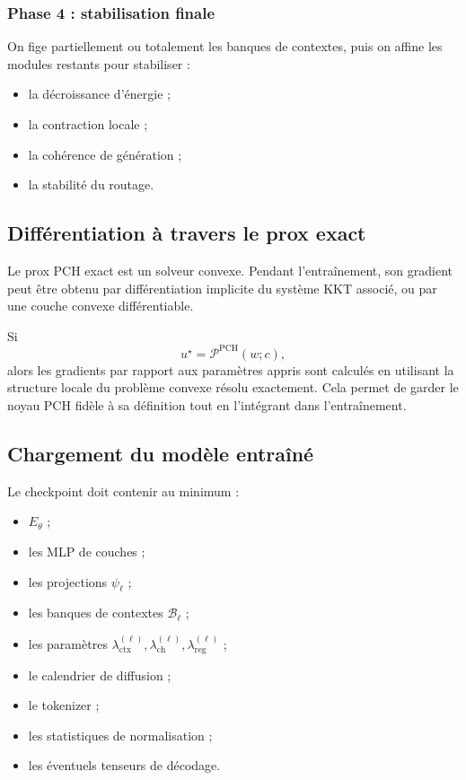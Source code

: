 \documentclass[11pt]{article}
\providecommand{\Ppch}{\mathcal P^{\mathrm{PCH}}}
\begin{document}
\subsubsection{Phase 4 : stabilisation finale}

On fige partiellement ou totalement les banques de contextes, puis on affine les modules restants pour stabiliser :
\begin{itemize}[leftmargin=2em]
    \item la décroissance d'énergie ;
    \item la contraction locale ;
    \item la cohérence de génération ;
    \item la stabilité du routage.
\end{itemize}

\subsection{Différentiation à travers le prox exact}

Le prox PCH exact est un solveur convexe.  
Pendant l'entraînement, son gradient peut être obtenu par différentiation implicite du système KKT associé, ou par une couche convexe différentiable.

Si
\[
u^\star = \Ppch(w;c),
\]
alors les gradients par rapport aux paramètres appris sont calculés en utilisant la structure locale du problème convexe résolu exactement. Cela permet de garder le noyau PCH fidèle à sa définition tout en l'intégrant dans l'entraînement.

\subsection{Chargement du modèle entraîné}

Le checkpoint doit contenir au minimum :
\begin{itemize}[leftmargin=2em]
    \item \(E_\theta\) ;
    \item les MLP de couches ;
    \item les projections \(\psi_\ell\) ;
    \item les banques de contextes \(\mathcal B_\ell\) ;
    \item les paramètres \(\lambda_{\mathrm{ctx}}^{(\ell)},\lambda_{\mathrm{ch}}^{(\ell)},\lambda_{\mathrm{reg}}^{(\ell)}\) ;
    \item le calendrier de diffusion ;
    \item le tokenizer ;
    \item les statistiques de normalisation ;
    \item les éventuels tenseurs de décodage.
\end{itemize}
\end{document}
